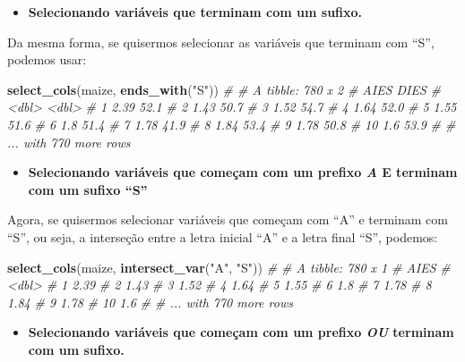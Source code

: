 \documentclass[
]{book}
\newenvironment{Shaded}{\begin{snugshade}}{\end{snugshade}}
\newcommand{\CommentTok}[1]{\textcolor[rgb]{0.56,0.35,0.01}{\textit{#1}}}
\newcommand{\KeywordTok}[1]{\textcolor[rgb]{0.13,0.29,0.53}{\textbf{#1}}}
\newcommand{\NormalTok}[1]{#1}
\newcommand{\StringTok}[1]{\textcolor[rgb]{0.31,0.60,0.02}{#1}}
\providecommand{\tightlist}{%
  \setlength{\itemsep}{0pt}\setlength{\parskip}{0pt}}
\begin{document}
\begin{itemize}
\tightlist
\item
  \textbf{Selecionando variáveis que terminam com um sufixo.}
\end{itemize}

Da mesma forma, se quisermos selecionar as variáveis que terminam com ``S'', podemos usar:

\begin{Shaded}
\begin{Highlighting}[]
\KeywordTok{select_cols}\NormalTok{(maize, }\KeywordTok{ends_with}\NormalTok{(}\StringTok{"S"}\NormalTok{))}
\CommentTok{# # A tibble: 780 x 2}
\CommentTok{#     AIES  DIES}
\CommentTok{#    <dbl> <dbl>}
\CommentTok{#  1  2.39  52.1}
\CommentTok{#  2  1.43  50.7}
\CommentTok{#  3  1.52  54.7}
\CommentTok{#  4  1.64  52.0}
\CommentTok{#  5  1.55  51.6}
\CommentTok{#  6  1.8   51.4}
\CommentTok{#  7  1.78  41.9}
\CommentTok{#  8  1.84  53.4}
\CommentTok{#  9  1.78  50.8}
\CommentTok{# 10  1.6   53.9}
\CommentTok{# # ... with 770 more rows}
\end{Highlighting}
\end{Shaded}

\begin{itemize}
\tightlist
\item
  \textbf{Selecionando variáveis que começam com um prefixo \emph{A} E terminam com um sufixo ``S''}
\end{itemize}

Agora, se quisermos selecionar variáveis que começam com ``A'' e terminam com ``S'', ou seja, a interseção entre a letra inicial ``A'' e a letra final ``S'', podemos:

\begin{Shaded}
\begin{Highlighting}[]
\KeywordTok{select_cols}\NormalTok{(maize, }\KeywordTok{intersect_var}\NormalTok{(}\StringTok{"A"}\NormalTok{, }\StringTok{"S"}\NormalTok{))}
\CommentTok{# # A tibble: 780 x 1}
\CommentTok{#     AIES}
\CommentTok{#    <dbl>}
\CommentTok{#  1  2.39}
\CommentTok{#  2  1.43}
\CommentTok{#  3  1.52}
\CommentTok{#  4  1.64}
\CommentTok{#  5  1.55}
\CommentTok{#  6  1.8 }
\CommentTok{#  7  1.78}
\CommentTok{#  8  1.84}
\CommentTok{#  9  1.78}
\CommentTok{# 10  1.6 }
\CommentTok{# # ... with 770 more rows}
\end{Highlighting}
\end{Shaded}

\begin{itemize}
\tightlist
\item
  \textbf{Selecionando variáveis que começam com um prefixo \emph{OU} terminam com um sufixo.}
\end{itemize}
\end{document}
